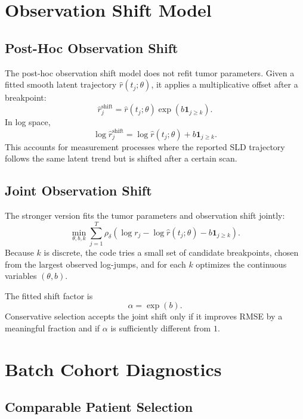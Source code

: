 \documentclass[11pt,a4paper]{article}
\begin{document}
\section{Observation Shift Model}

\subsection{Post-Hoc Observation Shift}

The post-hoc observation shift model does not refit tumor parameters. Given a fitted smooth latent trajectory $\hat{r}(t_j;\theta)$, it applies a multiplicative offset after a breakpoint:
\[
    \hat{r}^{\mathrm{shift}}_j
    =
    \hat{r}(t_j;\theta)\exp(b\mathbf{1}_{j\geq k}).
\]
In log space,
\[
    \log \hat{r}^{\mathrm{shift}}_j
    = \log \hat{r}(t_j;\theta) + b\mathbf{1}_{j\geq k}.
\]
This accounts for measurement processes where the reported SLD trajectory follows the same latent trend but is shifted after a certain scan.

\subsection{Joint Observation Shift}

The stronger version fits the tumor parameters and observation shift jointly:
\[
    \min_{\theta,b,k}
    \sum_{j=1}^{T}
    \rho_\delta\left(
    \log r_j
    - \log \hat{r}(t_j;\theta)
    - b\mathbf{1}_{j\geq k}
    \right).
\]
Because $k$ is discrete, the code tries a small set of candidate breakpoints, chosen from the largest observed log-jumps, and for each $k$ optimizes the continuous variables $(\theta,b)$.

The fitted shift factor is
\[
    \alpha = \exp(b).
\]
Conservative selection accepts the joint shift only if it improves RMSE by a meaningful fraction and if $\alpha$ is sufficiently different from $1$.

\section{Batch Cohort Diagnostics}

\subsection{Comparable Patient Selection}
\end{document}
